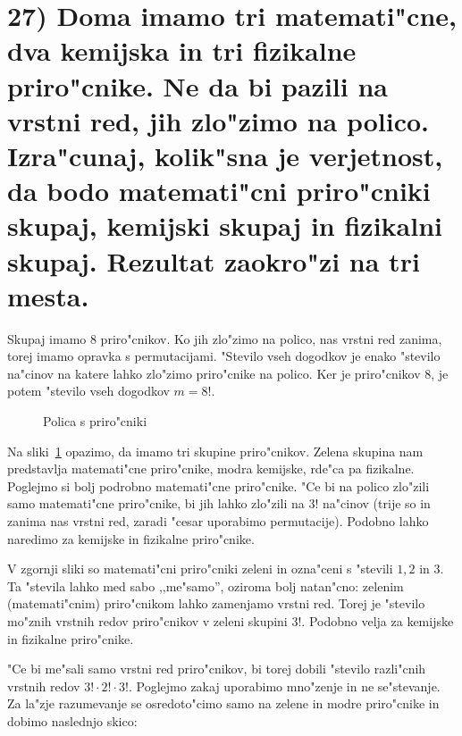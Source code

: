 \documentclass[a4paper, 12pt]{article}
\begin{document}
\section*{27) Doma imamo tri matemati"cne, dva kemijska in tri fizikalne priro"cnike. Ne da bi pazili na vrstni red, jih zlo"zimo na polico. Izra"cunaj, kolik"sna je verjetnost, da bodo matemati"cni priro"cniki skupaj, kemijski skupaj in fizikalni skupaj. Rezultat zaokro"zi na tri mesta.}
Skupaj imamo 8 priro"cnikov. Ko jih zlo"zimo na polico, nas vrstni red zanima, torej imamo opravka s permutacijami. "Stevilo vseh dogodkov je enako "stevilo na"cinov na katere lahko zlo"zimo priro"cnike na polico. Ker je priro"cnikov 8, je potem "stevilo vseh dogodkov $m = 8!$.

\begin{figure}[!htbp]
	\centering
	\caption{Polica s priro"cniki}
	\label{img:polica}
\end{figure}

Na sliki~\ref{img:polica} opazimo, da imamo tri skupine priro"cnikov. Zelena skupina nam predstavlja matemati"cne priro"cnike, modra kemijske, rde"ca pa fizikalne. Poglejmo si bolj podrobno matemati"cne priro"cnike. "Ce bi na polico zlo"zili samo matemati"cne priro"cnike, bi jih lahko zlo"zili na $3!$ na"cinov (trije so in zanima nas vrstni red, zaradi "cesar uporabimo permutacije). Podobno lahko naredimo za kemijske in fizikalne priro"cnike.

V zgornji sliki so matemati"cni priro"cniki zeleni in ozna"ceni s "stevili $1, 2$ in $3$. Ta "stevila lahko med sabo ,,me"samo'', oziroma bolj natan"cno: zelenim (matemati"cnim) priro"cnikom lahko zamenjamo vrstni red. Torej je "stevilo mo"znih vrstnih redov priro"cnikov v zeleni skupini $3!$. Podobno velja za kemijske in fizikalne priro"cnike.

"Ce bi me"sali samo vrstni red priro"cnikov, bi torej dobili "stevilo razli"cnih vrstnih redov $3! \cdot 2! \cdot 3!$. Poglejmo zakaj uporabimo mno"zenje in ne se"stevanje. Za la"zje razumevanje se osredoto"cimo samo na zelene in modre priro"cnike in dobimo naslednjo skico:
\begin{figure}[!htbp]
	\centering
\end{figure}
\end{document}
